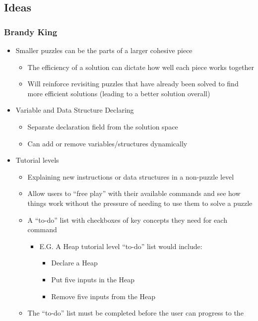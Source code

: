 \subsection{Ideas}
\subsubsection{Brandy King}
\begin{itemize}
  \item Smaller puzzles can be the parts of a larger cohesive piece
  \begin{itemize}
    \item The efficiency of a solution can dictate how well each piece works
    together
    \item Will reinforce revisiting puzzles that have already been solved to
    find more efficient solutions (leading to a better solution overall)
  \end{itemize}
  \item Variable and Data Structure Declaring
  \begin{itemize}
    \item Separate declaration field from the solution space
    \item Can add or remove variables/structures dynamically
  \end{itemize}
  \item Tutorial levels
  \begin{itemize}
    \item Explaining new instructions or data structures in a non-puzzle level
    \item Allow users to “free play” with their available commands and see how
    things work without the pressure of needing to use them to solve a puzzle
    \item A “to-do” list with checkboxes of key concepts they need for each
    command
    \begin{itemize}
      \item E.G. A Heap tutorial level “to-do” list would include:
      \begin{itemize}
        \item Declare a Heap
        \item Put five inputs in the Heap
        \item Remove five inputs from the Heap
      \end{itemize}
    \end{itemize}
    \item The “to-do” list must be completed before the user can progress to the

\end{itemize}
\end{itemize}
